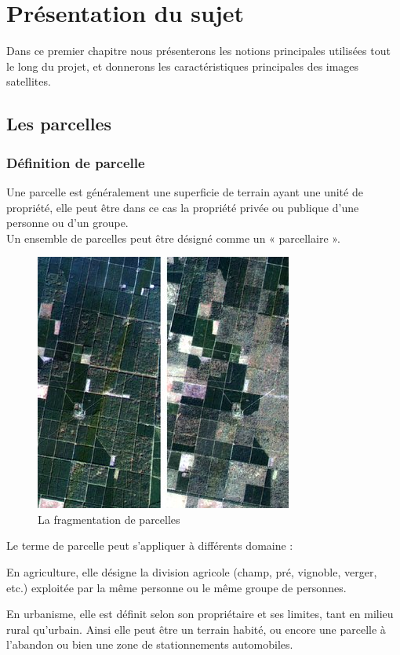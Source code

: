 \documentclass[12pt, openany]{report}
\begin{document}
\chapter{Présentation du sujet}


Dans ce premier chapitre nous présenterons les notions principales utilisées tout le long du projet, et donnerons les caractéristiques principales des images satellites.


\newpage
\section{Les parcelles}

\subsection{Définition de parcelle}
Une parcelle est généralement une superficie de terrain ayant une unité de propriété, elle peut être dans ce cas la propriété privée ou publique d'une personne ou d'un groupe.\\
Un ensemble de parcelles peut être désigné comme un « parcellaire ». 

\begin{figure}[H]
\centering
\includegraphics[scale=0.7]{seg.jpg}
\caption{La fragmentation de parcelles}
\end{figure}


Le terme de parcelle peut s'appliquer à différents domaine :

\begin{mylist}

\item En agriculture, elle désigne la division agricole (champ, pré, vignoble, verger, etc.) exploitée par la même personne ou le même groupe de personnes.


\item En urbanisme, elle est définit selon son propriétaire et ses limites, tant en milieu rural qu'urbain. Ainsi elle peut être un terrain habité, ou encore une parcelle à l'abandon ou bien une zone de stationnements automobiles. 

\end{mylist}
\end{document}
